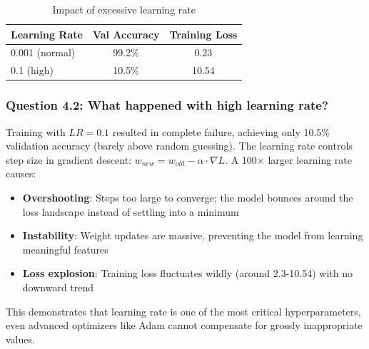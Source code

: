 \begin{table}[h]
\centering
\begin{tabular}{|l|c|c|}
\hline
\textbf{Learning Rate} & \textbf{Val Accuracy} & \textbf{Training Loss} \\ \hline
0.001 (normal) & 99.2\% & 0.23 \\ \hline
0.1 (high) & 10.5\% & 10.54 \\ \hline
\end{tabular}
\caption{Impact of excessive learning rate}
\label{tab:lr-comparison}
\end{table}

\subsubsection{Question 4.2: What happened with high learning rate?}

Training with $LR=0.1$ resulted in complete failure, achieving only 10.5\% validation accuracy (barely above random guessing). The learning rate controls step size in gradient descent: $w_{new} = w_{old} - \alpha \cdot \nabla L$. A 100× larger learning rate causes:

\begin{itemize}
    \item \textbf{Overshooting}: Steps too large to converge; the model bounces around the loss landscape instead of settling into a minimum
    \item \textbf{Instability}: Weight updates are massive, preventing the model from learning meaningful features
    \item \textbf{Loss explosion}: Training loss fluctuates wildly (around 2.3-10.54) with no downward trend
\end{itemize}

This demonstrates that learning rate is one of the most critical hyperparameters, even advanced optimizers like Adam cannot compensate for grossly inappropriate values.